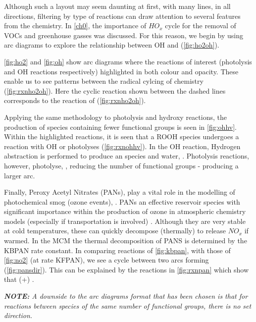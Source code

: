 Although such a layout may seem daunting at first, with many lines, in all directions, filtering by type of reactions can draw attention to several features from the chemistry. In \autoref{ch0}, the importance of $HO_x$ cycle for the removal of VOCs and greenhouse gasses was discussed. For this reason, we begin by using arc diagrams to explore the relationship between OH and  (\autoref{fig:ho2oh}).

\autoref{fig:ho2} and \autoref{fig:oh} show arc diagrams where the reactions of interest (photolysis and OH reactions respectively) highlighted in both colour and opacity. These enable us to see patterns between the radical cylcing of  chemistry (\autoref{fig:rxnho2oh}). Here the cyclic reaction shown between the dashed lines corresponds to the reaction of  (\autoref{fig:rxnho2oh}).

Applying the same methodology to photolysis and hydroxy reactions, the production of species containing fewer functional groups is seen in \autoref{fig:ohhv}. Within the highlighted reactions, it is seen that a ROOH species undergoes a reaction with OH or photolyses (\autoref{fig:rxnohhv}). In the OH reaction, Hydrogen abstraction is performed to produce an  species and water, . Photolysis reactions, however, photolyse, , reducing the number of functional groups - producing a larger arc.

Finally, Peroxy Acetyl Nitrates (PANs), play a vital role in the modelling of photochemical smog (ozone events), \citep{pans}. PANs an effective reservoir species with significant importance within the production of ozone in atmospheric chemistry models (especially if transportation is involved) \citep{finlayson}. Although they are very stable at cold temperatures, these can quickly decompose (thermally) to release $NO_x$ if warmed. In the MCM the thermal decomposition of PANS is determined by the KBPAN rate constant. In comparing reactions of \autoref{fig:kbpan}, with those of \autoref{fig:no2} (at rate KFPAN), we see a cycle between two arcs forming (\autoref{fig:pansdir}). This can be explained by the reactions in \autoref{fig:rxnpan} which show that  (+) .

\textit{\textbf{NOTE:} A downside to the arc diagrams format that has been chosen is that for reactions between species of the same number of functional groups, there is no set direction. }



